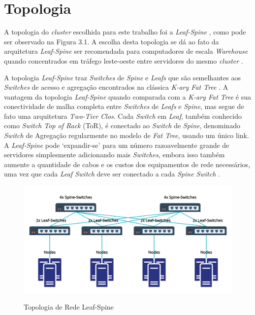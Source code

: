 \section{Topologia}

A topologia do \emph{cluster} escolhida para este trabalho foi a \emph{Leaf-Spine} \cite{CiscoLeafSpine}, como pode ser observado na Figura 3.1. A escolha desta topologia se dá ao fato da arquitetura \emph{Leaf-Spine} ser recomendada para computadores de escala \emph{Warehouse} \cite{efficiency2012cisco} quando concentrados em tráfego leste-oeste entre servidores do mesmo \emph{cluster} \cite{IntroductionLeafSpine}. 


A topologia \emph{Leaf-Spine} traz \emph{Switches} de \emph{Spine} e \emph{Leafs} que são semelhantes aos \emph{Switches} de acesso e agregação encontrados na clássica \emph{K-ary Fat Tree} \cite{vahdat2013scalable}. A vantagem da topologia \emph{Leaf-Spine} quando comparada com a \emph{K-ary Fat Tree} é sua conectividade de malha completa entre \emph{Switches} de \emph{Leafs} e \emph{Spine}, mas segue de fato uma arquitetura \emph{Two-Tier Clos}. Cada \emph{Switch} em \emph{Leaf}, também conhecido como \emph{Switch Top of Rack} (ToR), é conectado ao \emph{Switch} de \emph{Spine}, denominado \emph{Switch} de Agregação regularmente no modelo de \emph{Fat Tree}, usando um único link. A \emph{Leaf-Spine} pode `expandir-se' para um número razoavelmente grande de servidores simplesmente adicionando mais \emph{Switches}, embora isso também aumente a quantidade de cabos e os custos dos equipamentos de rede necessários, uma vez que cada \emph{Leaf Switch} deve ser conectado a cada \emph{Spine Switch} \cite{IntroductionLeafSpine}.

\begin{figure}[htp]
    \centering
    \includegraphics[width=14cm]{3-metodologia/Topologia de Rede - Dissertação.png}
    \caption{Topologia de Rede Leaf-Spine}
    \cite{CiscoLeafSpine}
    \label{fig:TopologiaDeRede}
\end{figure}


